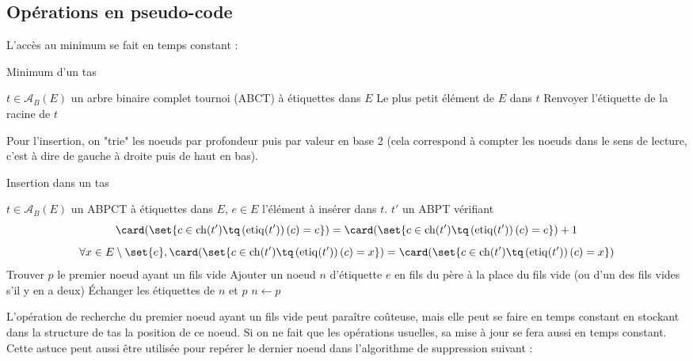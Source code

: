 \documentclass{scrartcl}
\begin{document}
		\subsection{Opérations en pseudo-code}
			L'accès au minimum se fait en temps constant : 

			\begin{algorithm}[H]
					\caption{Minimum d'un tas}
					\Entree
					{
						$t \in \mathscr{A}_B(E)$ un arbre binaire complet tournoi (ABCT) à étiquettes dans $E$
					}
					\Sortie
					{
						Le plus petit élément de $E$ dans $t$
					}
					Renvoyer l'étiquette de la racine de $t$
			\end{algorithm}

			Pour l'insertion, on "trie" les noeuds par profondeur puis par valeur en base 2 (cela correspond à compter les noeuds dans le sens de lecture, c'est à dire de gauche à droite puis de haut en bas).

			\begin{algorithm}[H]
				\caption{Insertion dans un tas}
				\Entree
				{
					$t \in \mathscr{A}_B(E)$ un ABPCT à étiquettes dans $E$, 
					$e \in E$ l'élément à insérer dans $t$.
				}
				\Sortie
				{
					$t'$ un ABPT vérifiant 
					\[
						\card(\set{c \in \mathrm{ch}(t') \tq \left(\mathrm{etiq}(t')\right)(c) = e}) = \card(\set{c \in \mathrm{ch}(t') \tq \left(\mathrm{etiq}(t')\right)(c) = e}) + 1
					\] 
					\[
						\forall x \in E\setminus\set{e}, \card(\set{c \in \mathrm{ch}(t') \tq \left(\mathrm{etiq}(t')\right)(c) = x}) = \card(\set{c \in \mathrm{ch}(t') \tq \left(\mathrm{etiq}(t')\right)(c) = x})
					\]
				}
					Trouver $p$ le premier noeud ayant un fils vide \;
					Ajouter un noeud $n$ d'étiquette $e$ en fils du père à la place du fils vide (ou d'un des fils vides s'il y en a deux) \;
					{
						Échanger les étiquettes de $n$ et $p$ \;
						$n \leftarrow p$
					}
			\end{algorithm}

			\rem L'opération de recherche du premier noeud ayant un fils vide peut paraître coûteuse, mais elle peut se faire en temps constant en stockant dans la structure de tas la position de ce noeud. Si on ne fait que les opérations usuelles, sa mise à jour se fera aussi en temps constant. Cette astuce peut aussi être utilisée pour repérer le dernier noeud dans l'algorithme de suppression suivant :
\end{document}
